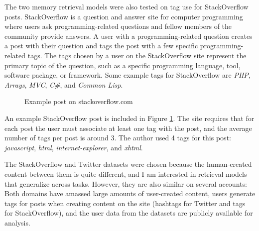 \documentclass[man,floatsintext,donotrepeattitle]{apa6}
\begin{document}
The two memory retrieval models were also tested on tag use for StackOverflow posts.
StackOverflow is a question and answer site for computer programming where users ask programming-related questions and fellow members of the community provide answers.
A user with a programming-related question creates a post with their question and tags the post with a few specific programming-related tags. 
The tags chosen by a user on the StackOverflow site represent the primary topic of the question, such as a specific programming language, tool, software package, or framework.
Some example tags for StackOverflow are \emph{PHP}, \emph{Arrays}, \emph{MVC}, \emph{C\#}, and \emph{Common Lisp}.

\begin{figure}[!htbp]
  \caption{Example post on stackoverflow.com}
  \label{figSOExample}
\end{figure}

An example StackOverflow post is included in Figure \ref{figSOExample}.
The site requires that for each post the user must associate at least one tag with the post, and the average number of tags per post is around 3.
The author used 4 tags for this post: \emph{javascript}, \emph{html}, \emph{internet-explorer}, and \emph{xhtml}.

The StackOverflow and Twitter datasets were chosen because the human-created content between them is quite different, and I am interested in retrieval models that generalize across tasks.
However, they are also similar on several accounts:
Both domains have amassed large amounts of user-created content, users generate tags for posts when creating content on the site (hashtags for Twitter and tags for StackOverflow),
and the user data from the datasets are publicly available for analysis.
\end{document}
